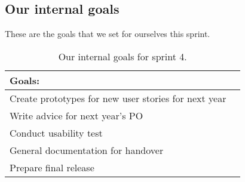 \subsection{Our internal goals}\label{subsec:sprint-4-PO-goals}
These are the goals that we set for ourselves this sprint.
\begin{table}[H]
    \centering
    \begin{tabular}{|l|l|}
    \hline
    Goals:  \\ \hline
     Create prototypes for new user stories for next year \\ \hline
     Write advice for next year's PO \\ \hline
     Conduct usability test \\ \hline
     General documentation for handover \\ \hline
     Prepare final release \\ \hline
    \end{tabular}
    \caption{Our internal goals for sprint 4.}
\end{table}
